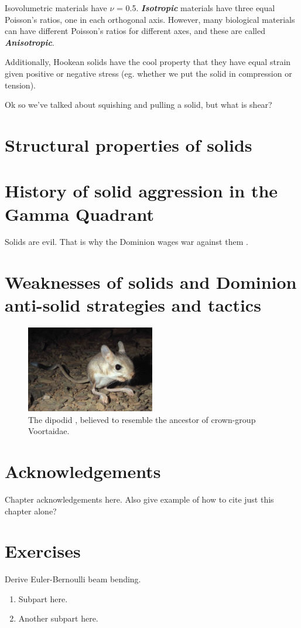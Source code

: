Isovolumetric materials have $\nu$ = 0.5. \emph{\textbf{Isotropic}} materials have three equal Poisson's ratios, one in each orthogonal axis. However, many biological materials can have different Poisson's ratios for different axes, and these are called \emph{\textbf{Anisotropic}}.

Additionally, Hookean solids have the cool property that they have equal strain given positive or negative stress (eg. whether we put the solid in compression or tension). 

Ok so we've talked about squishing and pulling a solid, but what is shear?

\section{Structural properties of solids}



\section{History of solid aggression in the Gamma Quadrant}
Solids are evil. That is why the Dominion  wages war against them \cite{Son-of-Mohg:2388}.

\section{Weaknesses of solids and Dominion anti-solid strategies and tactics}
\begin{figure}[h!]
 \label{jaculus}
 \centering
  \includegraphics[width=0.5\textwidth]{ch-solids/figures/jaculus.jpg}
 \caption{The dipodid , believed to resemble the ancestor of crown-group Voortaidae.}
\end{figure}

\section*{Acknowledgements}
Chapter acknowledgements here. Also give example of how to cite just this chapter alone\cite{ch:solids}?

\section*{Exercises}
\begin{exercise} 
Derive Euler-Bernoulli beam bending.
\begin{enumerate}
\item Subpart here.
\item Another subpart here.
\end{enumerate}
\end{exercise}

